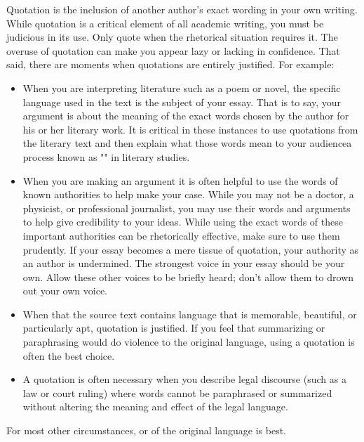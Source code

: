 Quotation is the inclusion of another author's exact wording in your own writing. While quotation is a critical element of all academic writing, you must be judicious in its use. Only quote when the rhetorical situation 
requires it. The overuse of quotation can make you appear lazy or lacking in confidence. That said, there are moments when quotations are entirely justified. For example:

\begin{itemize}

\item When you are interpreting literature such as a poem or novel, the specific language used in the text is the subject of your essay. That is to say, your argument is about the meaning of the exact words chosen by the author for his or her literary work. It is critical in these instances to use quotations from the literary text and then explain what those words mean to your audience\textemdash a process known as "\hyperlink{closereadingessay}{\color{Ahrenge}{close reading}}" in literary studies. 


\item When you are making an argument it is often helpful to use the words of known authorities to help make your case. While you may not be a doctor, a physicist, or professional journalist, you may use their words and arguments to help give credibility to your ideas. While using the exact words of these important authorities can be rhetorically effective, make sure to use them prudently. If your essay becomes a mere tissue of quotation, your authority as an author is undermined. The strongest voice in your essay should be your own. Allow these other voices to be briefly heard; don't allow them to drown out your own voice.

\item When that the source text contains language that is memorable, beautiful, or particularly apt, quotation is 
justified. If you feel that summarizing or paraphrasing would do violence to the original language, using a quotation is often the best choice.

\item A quotation is often necessary when you describe legal discourse (such as a law or court ruling) where words cannot be paraphrased or summarized without altering the meaning and effect of the legal language.

\end{itemize}

\noindent For most other circumstances, \hyperlink{summary}{\color{Ahrenge}{summary}} or \hyperlink{paraphrase}{\color{Ahrenge}{paraphrase}} of the original language is best.


